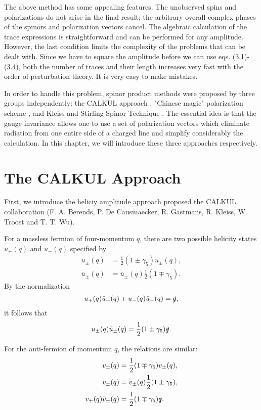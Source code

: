 The above method has some appealing features. The unobserved spins and polarizations do not arise in the final result; the arbitrary overall complex phases of the spinors and polarization vectors cancel. The algebraic calculation of the trace expressions is straightforward and can be performed for any amplitude. However, the last condition limits the complexity of the problems that can be dealt with. Since we have to square the amplitude before we can use eqs. (3.1)-(3.4), both the number of traces and their length increases very fast with the order of perturbation theory. It is very easy to make mistakes.

In order to handle this problem, spinor product methods were proposed by three groups independently: the CALKUL approach \cite{calkul1,calkul3,calkul2,calkul4,CALKUL}, "Chinese magic" polarization scheme \cite{ChnMag},  and Kleiss and Stirling Spinor Technique \cite{KS}. The essential idea is that the gauge invariance allows one to use a set of polarization vectors which eliminate radiation from one entire side of a charged line and simplify considerably the calculation. In this chapter, we will introduce these three approaches respectively.


\section{The CALKUL Approach}
First, we introduce the heliciy amplitude approach \cite{calkul1,calkul3,calkul2,calkul4} proposed the CALKUL collaboration (F. A. Berends, P. De Causmaecker, R. Gastmans, R. Kleiss, W. Troost and T. T. Wu).

For a massless fermion of four-momentum $q$, there are two possible helicity states $u_+(q)$ and $u_-(q)$ specified by
\begin{align}
u_\pm(q)&=\frac{1}{2}(1\pm\gamma_5)u_\pm(q),\\
\bar{u}_\pm(q)&=\bar{u}_\pm(q)\frac{1}{2}(1\mp\gamma_5).
\end{align}
By the normalization
\begin{equation}
u_+(q)\bar{u}_+(q)+u_-(q)\bar{u}_-(q)=\slashed q,
\end{equation}
it follows that
\begin{equation}
u_\pm(q)\bar{u}_\pm(q)=\frac{1}{2}(1\pm\gamma_5)\slashed q.
\end{equation}

For the anti-fermion of momentum $q$, the relations are similar:
\begin{align}
v_\pm(q)&=\frac{1}{2}(1\mp\gamma_5)v_\pm(q),\\
\bar{v}_\pm(q)&=\bar{v}_\pm(q)\frac{1}{2}(1\pm\gamma_5),\\
v_\pm(q)\bar{v}_\pm(q)&=\frac{1}{2}(1\mp\gamma_5)\slashed q.
\end{align}


